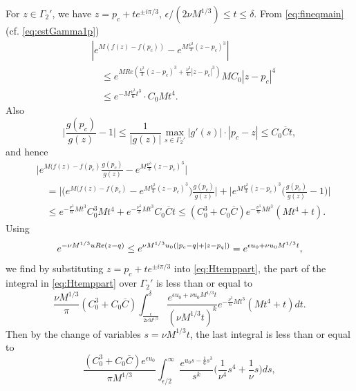 \documentclass[11pt]{article}
\begin{document}
For $z\in \Gamma_2'$, we have
$z=p_c + te^{\pm i\pi/3}$, $\epsilon/(2\nu M^{1/3}) \le t\le \delta$.
From \eqref{eq:fineqmain} (cf. \eqref{eq:estGamma1p})
\begin{equation}
\begin{split}
  &|e^{M(f(z)-f(p_c))} - e^{M\frac{\nu^3}3(z-p_c)^3} | \\
  &\quad \le e^{MRe(\frac{\nu^3}3(z-p_c)^3+\frac{\nu^3}6|z-p_c|^3 )}
MC_{0} |z-p_c|^4 \\
  &\quad \le e^{-M\frac{\nu^3}6 t^3} \cdot C_{0} Mt^4.
\end{split}
\end{equation}
Also
\begin{equation}
  \biggl|  \frac{g(p_c)}{g(z)}-1 \biggr|
  \le \frac{1}{|g(z)|} \max_{s\in \Gamma_2'} |g'(s)| \cdot |p_c-z|
  \le C_0\overline{C} t,
\end{equation}
and hence
\begin{equation}
\begin{split}
  &\biggl| e^{M(f(z)-f(p_c)} \frac{g(p_c)}{g(z)} -
e^{M\frac{\nu^3}3 (z-p_c)^3} \biggr| \\
  &\quad =  \biggl| \bigl( e^{M(f(z)-f(p_c)} - e^{M\frac{\nu^3}3(z-p_c)^3}\bigr)
\frac{g(p_c)}{g(z)} \biggr|
  +
\biggl| e^{M\frac{\nu^3}3 (z-p_c)^3} \bigl( \frac{g(p_c)}{g(z)}-1 \bigr)\biggr|  \\
  &\quad
\le e^{-\frac{\nu^3}6 Mt^3}C_0^3Mt^4 + e^{-\frac{\nu^3}3 Mt^3} C_0\overline{C}t
\le (C_0^3+C_0\overline{C}) e^{-\frac{\nu^3}6 Mt^3} (Mt^4+t).
\end{split}
\end{equation}
Using
\begin{equation}
  e^{-\nu M^{1/3} uRe (z-q)}  \le e^{\nu M^{1/3}u_0 (|p_c-q|+|z-p_q|)}
  = e^{\epsilon u_0+\nu u_0 M^{1/3}t},
\end{equation}
we find by substituting $z=p_c+ t e^{\pm i\pi/3}$ into \eqref{eq:Htemppart},
the part of the integral in \eqref{eq:Htemppart} over $\Gamma_2'$ is less than or equal to
\begin{equation}
  \frac{\nu M^{1/3}}{\pi}(C_0^3+C_0\overline{C})
\int_{\frac{\epsilon}{2\nu M^{1/3}}}^{\delta}
  \frac{e^{\epsilon u_0+\nu u_0 M^{1/3}t}}{(\nu M^{1/3} t)^k}
e^{-\frac{\nu^3}6Mt^3} (Mt^4+t) dt.
\end{equation}
Then by the change of variables $s=\nu M^{1/3}t$, the last integral is less than or equal to
\begin{equation}\label{eq:137}
  \frac{(C_0^3+C_0\overline{C})e^{\epsilon u_0}}{\pi M^{1/3}}
  \int_{\epsilon/2}^\infty
   \frac{e^{u_0s-\frac16 s^3}}{s^k} \bigl( \frac1{\nu^4}s^4+\frac1{\nu}s \bigr)
ds,
\end{equation}
\end{document}
